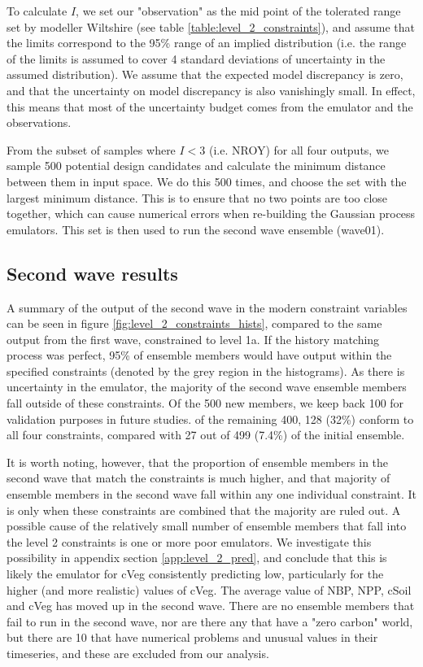 \documentclass[gmd, manuscript]{copernicus}
\begin{document}
To calculate $I$, we set our "observation" as the mid point of the tolerated range set by modeller Wiltshire (see table \ref{table:level_2_constraints}), and assume that the limits correspond to the 95\% range of an implied distribution (i.e. the range of the limits is assumed to cover 4 standard deviations of uncertainty in the assumed distribution). We assume that the expected model discrepancy is zero, and that the uncertainty on model discrepancy is also vanishingly small. In effect, this means that most of the uncertainty budget comes from the emulator and the observations.


From the subset of samples where $I < 3$ (i.e. NROY) for all four outputs, we sample 500 potential design candidates and calculate the minimum distance between them in input space. We do this 500 times, and choose the set with the largest minimum distance. This is to ensure that no two points are too close together, which can cause numerical errors when re-building the Gaussian process emulators. This set is then used to run the second wave ensemble (wave01).

\subsection{Second wave results}\label{ssec:second_wave_results}

A summary of the output of the second wave in the modern constraint variables can be seen in figure \ref{fig:level_2_constraints_hists}, compared to the same output from the first wave, constrained to level 1a. If the history matching process was perfect, 95\% of ensemble members would have output within the specified constraints (denoted by the grey region in the histograms). As there is uncertainty in the emulator, the majority of the second wave ensemble members fall outside of these constraints. Of the 500 new members, we keep back 100 for validation purposes in future studies. of the remaining 400, 128 (32\%) conform to all four constraints, compared with 27 out of 499 (7.4\%) of the initial ensemble.

It is worth noting, however, that the proportion of ensemble members in the second wave that match the constraints is much higher, and that majority of ensemble members in the second wave fall within any one individual constraint. It is only when these constraints are combined that the majority are ruled out. A possible cause of the relatively small number of ensemble members that fall into the level 2 constraints is one or more poor emulators. We investigate this possibility in appendix section \ref{app:level_2_pred}, and conclude that this is likely the emulator for cVeg consistently predicting low, particularly for the higher (and more realistic) values of cVeg. The average value of NBP, NPP, cSoil and cVeg has moved up in the second wave. There are no ensemble members that fail to run in the second wave, nor are there any that have a "zero carbon" world, but there are 10 that have numerical problems and unusual values in their timeseries, and these are excluded from our analysis.
\end{document}
